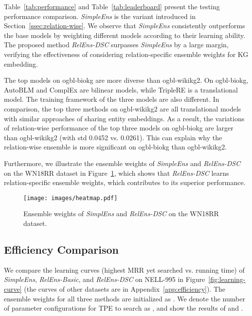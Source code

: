 \documentclass[11pt,a4paper]{article}
\begin{document}
  Table~\ref{tab:performance} and Table~\ref{tab:leaderboard} present 
  the testing performance comparison.
   \textit{SimpleEns} is the variant introduced in Section~\ref{ssec:relation-wise}. We observe that \textit{SimpleEns}
  consistently outperforms the base models
  by weighting different models according to their learning ability.
  The proposed method \textit{RelEns-DSC} surpasses \textit{SimpleEns} 
  by a large margin,
  verifying the effectiveness of
  considering relation-specific ensemble weights 
  for KG embedding. 
  
  




The top models on ogbl-biokg are more diverse than ogbl-wikikg2.
On ogbl-biokg,
AutoBLM and ComplEx are bilinear models, while TripleRE is a translational model.
The training framework of the three models are also different.
In comparison,
the top three methods on ogbl-wikikg2
are all translational models with similar approaches of sharing entity embeddings.
As a result,
the variations of relation-wise performance of the top three models
on ogbl-biokg are larger than ogbl-wikikg2 
(with std 0.0452 vs. 0.0261).
This can explain why the relation-wise ensemble is more significant on ogbl-biokg than ogbl-wikikg2.
  
  Furthermore,
  we illustrate the ensemble weights of 
  \textit{SimpleEns} and \textit{RelEns-DSC} on the WN18RR dataset in Figure~\ref{fig:model_weights},
  which shows that \textit{RelEns-DSC} learns relation-specific ensemble weights,
  which contributes to its superior performance.
  
  
  \begin{figure}[h]
\centering
    \texttt{[image: images/heatmap.pdf]}
\vspace{-14px}
    \caption{Ensemble weights of \textit{SimplEns} and \textit{RelEns-DSC} on the WN18RR dataset.}
  	\vspace{-5px}
    \label{fig:model_weights}
  \end{figure}
  
  
  \subsection{Efficiency Comparison}
  \label{sec:efficiency}
  We compare the learning curves (highest MRR yet searched vs. running time) of \textit{SimpleEns},
  \textit{RelEns-Basic}, and \textit{RelEns-DSC} on NELL-995 in Figure~\ref{fig:learning-curve} (the curves of other datasets are in Appendix~\ref{app:efficiency}).
  The ensemble weights for all three methods are initialized as .
  We denote the number of parameter configurations for TPE to search as ,
  and show the results of   and .
  
\end{document}
